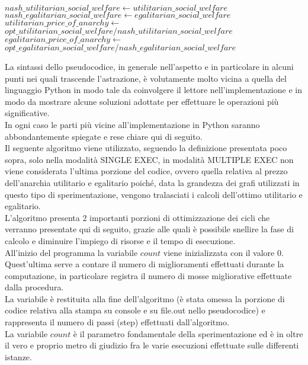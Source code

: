 \begin{algorithmic}
\State $nash\_utilitarian\_social\_welfare\gets utilitarian\_social\_welfare$
\State $nash\_egalitarian\_social\_welfare\gets egalitarian\_social\_welfare$ \\

	\State $utilitarian\_price\_of\_anarchy\gets$ \\
	$opt\_utilitarian\_social\_welfare / nash\_utilitarian\_social\_welfare$
\EndIf
{}
	\State $egalitarian\_price\_of\_anarchy\gets$ \\
	$opt\_egalitarian\_social\_welfare / nash\_egalitarian\_social\_welfare$
\EndIf \\

\end{algorithmic}

La sintassi dello pseudocodice, in generale nell'aspetto e in particolare in alcuni punti nei quali trascende l'astrazione, è volutamente molto vicina a quella del linguaggio Python in modo tale da coinvolgere il lettore nell'implementazione e in modo da mostrare alcune soluzioni adottate per effettuare le operazioni più significative.\\

In ogni caso le parti più vicine all'implementazione in Python saranno abbondantemente spiegate e rese chiare qui di seguito.\\

Il seguente algoritmo viene utilizzato, seguendo la definizione presentata poco sopra, solo nella modalità SINGLE EXEC, in modalità MULTIPLE EXEC non viene considerata l'ultima porzione del codice, ovvero quella relativa al prezzo dell'anarchia utilitario e egalitario poiché, data la grandezza dei grafi utilizzati in questo tipo di sperimentazione, vengono tralasciati i calcoli dell'ottimo utilitario e egalitario.\\

L'algoritmo presenta 2 importanti porzioni di ottimizzazione dei cicli che verranno presentate qui di seguito, grazie alle quali è possibile snellire la fase di calcolo e diminuire l'impiego di risorse e il tempo di esecuzione.\\

All'inizio del programma la variabile $count$ viene inizializzata con il valore 0.\\
Quest'ultima serve a contare il numero di miglioramenti effettuati durante la computazione, in particolare registra il numero di mosse migliorative effettuate dalla procedura.\\
La variabile è restituita alla fine dell'algoritmo (è stata omessa la porzione di codice relativa alla stampa su console e su file.out nello pseudocodice) e rappresenta il numero di passi (step) effettuati dall'algoritmo.\\
La variabile $count$ è il parametro fondamentale della sperimentazione ed è in oltre il vero e proprio metro di giudizio fra le varie esecuzioni effettuate sulle differenti istanze.\\

